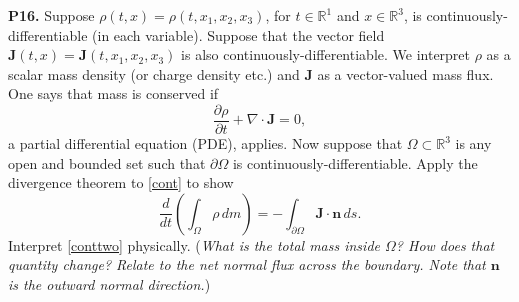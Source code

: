 \documentclass[12pt]{amsart}
\newcommand{\bn}{\mathbf{n}}
\newcommand{\bJ}{\mathbf{J}}
\newcommand{\RR}{\mathbb{R}}
\newcommand{\Div}{\nabla\cdot}
\newcommand{\prob}[1]{\bigskip\noindent\textbf{#1.}\quad }
\begin{document}
\prob{P16}  Suppose $\rho(t,x)=\rho(t,x_1,x_2,x_3)$, for $t\in\RR^1$ and $x\in\RR^3$, is continuously-differentiable (in each variable).  Suppose that the vector field $\bJ(t,x) = \bJ(t,x_1,x_2,x_3)$ is also continuously-differentiable.  We interpret $\rho$ as a scalar mass density (or charge density etc.) and $\bJ$ as a vector-valued mass flux.  One says that mass is conserved if
\begin{equation}
\frac{\partial\rho}{\partial t} + \Div \bJ = 0,  \label{cont}
\end{equation}
a partial differential equation (PDE), applies.  Now suppose that $\Omega\subset\RR^3$ is any open and bounded set such that $\partial\Omega$ is continuously-differentiable.  Apply the divergence theorem to \eqref{cont} to show
\begin{equation}
\frac{d}{dt}\left(\int_\Omega \rho\,dm\right) = - \int_{\partial\Omega} \bJ\cdot\bn\,ds.  \label{conttwo}
\end{equation}
Interpret \eqref{conttwo} physically.  (\emph{What is the total mass inside $\Omega$?  How does that quantity change?  Relate to the net normal flux across the boundary.  Note that $\bn$ is the \emph{outward} normal direction.})
\end{document}
